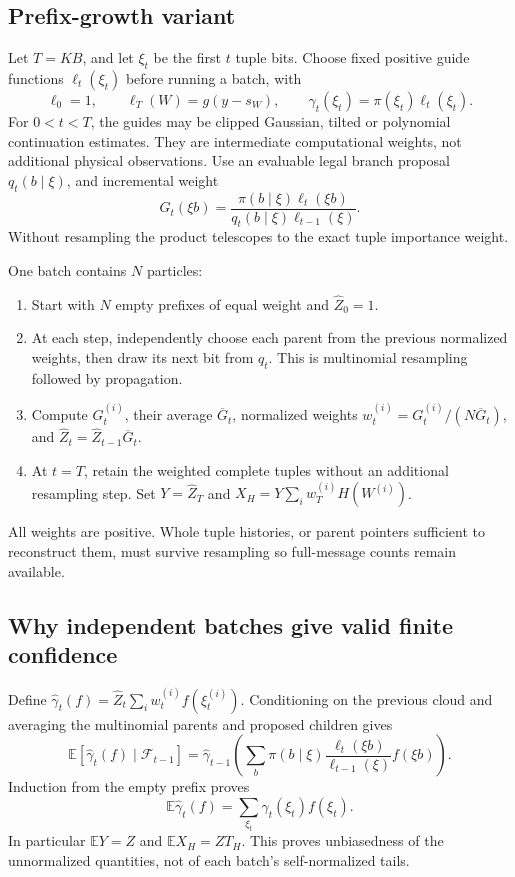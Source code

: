 \documentclass[10pt,a4paper]{article}
\newcommand{\E}{\mathbb E}
\begin{document}
\subsection{Prefix-growth variant}
Let $T=KB$, and let $\xi_t$ be the first $t$ tuple bits. Choose fixed positive guide functions
$\ell_t(\xi_t)$ before running a batch, with
\[
 \ell_0=1,\qquad \ell_T(W)=g(y-s_W),\qquad
 \gamma_t(\xi_t)=\pi(\xi_t)\ell_t(\xi_t).
\]
For $0<t<T$, the guides may be clipped Gaussian, tilted or polynomial continuation estimates.
They are intermediate computational weights, not additional physical observations.
Use an evaluable legal branch proposal $q_t(b\mid\xi)$, and incremental weight
\begin{equation}
 G_t(\xi b)=
 \frac{\pi(b\mid\xi)\ell_t(\xi b)}
      {q_t(b\mid\xi)\ell_{t-1}(\xi)}.
 \label{eq:particle-increment}
\end{equation}
Without resampling the product telescopes to the exact tuple importance weight.

One batch contains $N$ particles:
\begin{enumerate}
\item Start with $N$ empty prefixes of equal weight and $\widehat Z_0=1$.
\item At each step, independently choose each parent from the previous normalized weights, then draw
      its next bit from $q_t$. This is multinomial resampling followed by propagation.
\item Compute $G_t^{(i)}$, their average $\overline G_t$, normalized weights
      $w_t^{(i)}=G_t^{(i)}/(N\overline G_t)$, and
      $\widehat Z_t=\widehat Z_{t-1}\overline G_t$.
\item At $t=T$, retain the weighted complete tuples without an additional resampling step.
      Set $Y=\widehat Z_T$ and $X_H=Y\sum_iw_T^{(i)}H(W^{(i)})$.
\end{enumerate}
All weights are positive. Whole tuple histories, or parent pointers sufficient to reconstruct them,
must survive resampling so full-message counts remain available.

\subsection{Why independent batches give valid finite confidence}
Define $\widehat\gamma_t(f)=\widehat Z_t\sum_iw_t^{(i)}f(\xi_t^{(i)})$.
Conditioning on the previous cloud and averaging the multinomial parents and proposed children gives
\[
 \E[\widehat\gamma_t(f)\mid\mathcal F_{t-1}]
 =\widehat\gamma_{t-1}\!\left(
       \sum_b\pi(b\mid\xi)\frac{\ell_t(\xi b)}{\ell_{t-1}(\xi)}f(\xi b)\right).
\]
Induction from the empty prefix proves
\[
 \E\widehat\gamma_t(f)=\sum_{\xi_t}\gamma_t(\xi_t)f(\xi_t).
\]
In particular $\E Y=Z$ and $\E X_H=ZT_H$. This proves unbiasedness of the unnormalized quantities,
not of each batch's self-normalized tails.
\end{document}
